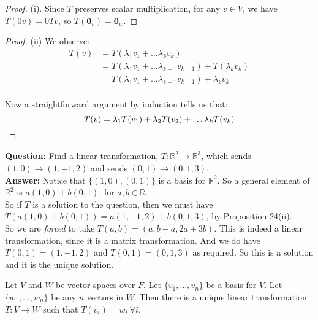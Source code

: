 \begin{proof} (i). Since $T$ preserves scalar multiplication, for any $v \in V$, we have $T(0v) = 0Tv$, so $T(\mathbf{0}_v) = \mathbf{0}_w$.

\end{proof}


\begin{proof} 
(ii)
We observe:
\[
\begin{aligned}
T(v) &= T(\lambda_1v_1 + \dots \lambda_kv_k)\\
&= T(\lambda_1v_1 + \dots \lambda_{k-1}v_{k-1}) + T(\lambda_kv_k)\\
&= T(\lambda_1v_1 + \dots \lambda_{k-1}v_{k-1}) + \lambda_kv_k\\
\end{aligned}\]

Now a straightforward argument by induction tells us that: \[T(v) = \lambda_1T(v_1) + \lambda_2T(v_2) + \dots \lambda_kT(v_k) \qedhere\]
\end{proof}

\begin{example} \textbf{Question:} Find a linear transformation, $T: \mathbb{R}^2 \to \mathbb{R}^3$, which sends $(1,0) \to (1,-1,2)$ and sends $(0,1) \to (0,1,3)$.\\

\textbf{Answer:} Notice that $\{(1,0), (0,1)\}$ is a basis for $\mathbb{R}^2$. So a general element of $\mathbb{R}^2$ is $a(1,0) + b(0,1)$, for $a,b \in \mathbb{R}$. \\

So if $T$ is a solution to the question, then we must have $T(a(1,0) + b(0,1)) = a(1,-1,2) + b(0,1,3)$, by Proposition 24(ii). \\

So we are \emph{forced} to take $T(a,b) = (a,b-a,2a+3b)$. This is indeed a linear transformation, since it is a matrix transformation. And we do have $T(0,1) = (1,-1,2)$ and $T(0,1) = (0,1,3)$ as required. So this is a solution and it is the unique solution.
\end{example}\vspace*{10pt}


\begin{proposition}Let $V$ and $W$ be vector spaces over $F$. Let $\{v_1,\dots,v_n\}$ be a basis for $V$. Let $\{w_1,\dots,w_n\}$ be any $n$ vectors in $W$. Then there is a unique linear transformation $T: V \to W$ such that $T(v_i) = w_i ~\forall i$.	
\end{proposition}\vspace*{10pt}


